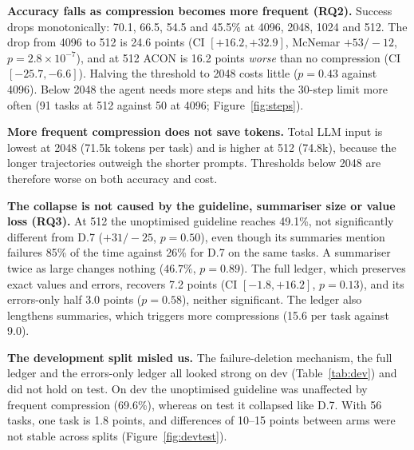 \documentclass[10pt,a4paper]{article}
\begin{document}
\textbf{Accuracy falls as compression becomes more frequent (RQ2).} Success
drops monotonically: 70.1, 66.5, 54.5 and 45.5\% at 4096, 2048, 1024 and 512.
The drop from 4096 to 512 is 24.6 points (CI $[+16.2,+32.9]$, McNemar
$+53/-12$, $p=2.8\times10^{-7}$), and at 512 ACON is 16.2 points \emph{worse}
than no compression (CI $[-25.7,-6.6]$). Halving the threshold to 2048 costs
little ($p=0.43$ against 4096). Below 2048 the agent needs more steps and hits
the 30-step limit more often (91 tasks at 512 against 50 at 4096;
Figure~\ref{fig:steps}).

\textbf{More frequent compression does not save tokens.} Total LLM input is
lowest at 2048 (71.5k tokens per task) and is higher at 512 (74.8k), because the
longer trajectories outweigh the shorter prompts. Thresholds below 2048 are
therefore worse on both accuracy and cost.

\textbf{The collapse is not caused by the guideline, summariser size or value
loss (RQ3).} At 512 the unoptimised guideline reaches 49.1\%, not
significantly different from D.7 ($+31/-25$, $p=0.50$), even though its
summaries mention failures 85\% of the time against 26\% for D.7 on the same
tasks. A summariser twice as large changes nothing ($46.7\%$, $p=0.89$). The
full ledger, which preserves exact values and errors, recovers 7.2 points (CI
$[-1.8,+16.2]$, $p=0.13$), and its errors-only half 3.0 points ($p=0.58$),
neither significant. The ledger also lengthens summaries, which triggers more
compressions (15.6 per task against 9.0).

\textbf{The development split misled us.} The failure-deletion mechanism, the
full ledger and the errors-only ledger all looked strong on dev
(Table~\ref{tab:dev}) and did not hold on test. On dev the unoptimised guideline
was unaffected by frequent compression (69.6\%), whereas on test it collapsed
like D.7. With 56 tasks, one task is 1.8 points, and differences of 10--15
points between arms were not stable across splits (Figure~\ref{fig:devtest}).
\end{document}
